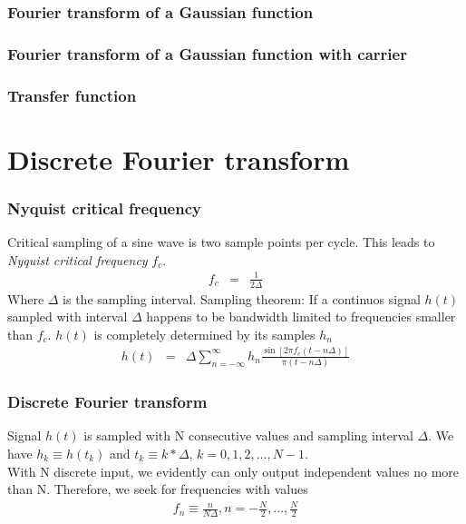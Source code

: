 \documentclass{beamer}
\begin{document}
\begin{frame}
\frametitle{Fourier transform of a Gaussian function}

\end{frame}
\begin{frame}
\frametitle{Fourier transform of a Gaussian function with carrier}
\end{frame}
\begin{frame}
\frametitle{Transfer function}

\end{frame}
\section{Discrete Fourier transform}
\begin{frame}
\frametitle{Nyquist critical frequency}
Critical sampling of a sine wave is two sample points per cycle. This leads to \emph{Nyquist critical frequency} $f_c$.
\begin{eqnarray}
f_c &=& \frac{1}{2\Delta}
\label{eq:Nyquist_frequency}
\end{eqnarray}
Where $\Delta$ is the sampling interval. Sampling theorem: If a continuos signal $h(t)$ sampled with interval $\Delta$ happens to be bandwidth limited to frequencies smaller than $f_c$. $h(t)$ is completely determined by its samples $h_n$
\begin{eqnarray}
h(t) &=& \Delta \sum_{n=-\infty}^{\infty} h_n \frac{\sin [2\pi f_c(t-n\Delta)]}{\pi (t-n\Delta)}
\label{eq:sampling_theorem}
\end{eqnarray}
\end{frame}
\begin{frame}
\frametitle{Discrete Fourier transform}
Signal $h(t)$ is sampled with N consecutive values and sampling interval $\Delta$. We have $h_k \equiv h(t_k)$ and $t_k \equiv k*\Delta$, $k = 0,1,2,...,N-1$. \\
With N discrete input, we evidently can only output independent values no more than N. Therefore, we seek for frequencies with values
\begin{eqnarray}
f_n \equiv \frac{n}{N\Delta}, n = -\frac{N}{2}, ...,\frac{N}{2}
\label{eq:DFT_Frequencies}
\end{eqnarray}
\end{frame}
\end{document}
